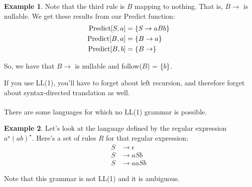 \documentclass[]{article}
\DeclarePairedDelimiter{\set}{\lbrace}{\rbrace}
\theoremstyle{definition}
\newtheorem{ex}{Example}[section]
\begin{document}
\begin{ex}
					Note that the third rule is $B$ mapping to nothing. That is, $B \to$ is nullable. We get these results from our Predict function:
					\begin{align*}
						\text{Predict}[S, a] &= \set{S \to aBb} \\
						\text{Predict}[B, a] &= \set{B \to a} \\
						\text{Predict}[B, b] &= \set{B \to}
					\end{align*}

					So, we have that $B \to $ is nullable and follow($B$) = $\set{b}$.
				\end{ex}

				If you use LL(1), you'll have to forget about left recursion, and therefore forget about syntax-directed translation as well.
				\\ \\
				There are some languages for which no LL(1) grammar is possible.
				\begin{ex}
					Let's look at the language defined by the regular expression $a^\star(ab)^\star$. Here's a set of rules $R$ for that regular expression:
					\begin{align*}
						S &\to \epsilon \\
						S &\to aSb \\
						S &\to aaSb
					\end{align*}

					Note that this grammar is not LL(1) and it is ambiguous.
				\end{ex}
\end{document}
